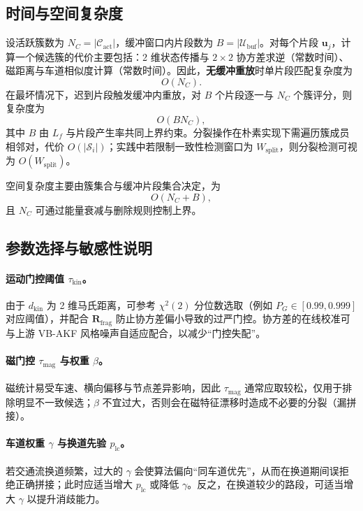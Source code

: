 \documentclass{xdupgthesis}
\begin{document}
\subsection{时间与空间复杂度}
设活跃簇数为 $N_C=|\mathcal{C}_{\mathrm{act}}|$，缓冲窗口内片段数为 $B=|\mathcal{U}_{\mathrm{buf}}|$。对每个片段 $\mathbf{u}_j$，计算一个候选簇的代价主要包括：2 维状态传播与 $2\times2$ 协方差求逆（常数时间）、磁距离与车道相似度计算（常数时间）。因此，\textbf{无缓冲重放}时单片段匹配复杂度为
\[
O(N_C).
\]
在最坏情况下，迟到片段触发缓冲内重放，对 $B$ 个片段逐一与 $N_C$ 个簇评分，则复杂度为
\[
O(BN_C),
\]
其中 $B$ 由 $L_f$ 与片段产生率共同上界约束。分裂操作在朴素实现下需遍历簇成员相邻对，代价 $O(|\mathcal{S}_i|)$；实践中若限制一致性检测窗口为 $W_{\mathrm{split}}$，则分裂检测可视为 $O(W_{\mathrm{split}})$。

空间复杂度主要由簇集合与缓冲片段集合决定，为
\[
O(N_C + B),
\]
且 $N_C$ 可通过能量衰减与删除规则控制上界。%

\subsection{参数选择与敏感性说明}
\paragraph{运动门控阈值 $\tau_{\mathrm{kin}}$。}
由于 $d_{\mathrm{kin}}$ 为 2 维马氏距离，可参考 $\chi^2(2)$ 分位数选取（例如 $P_G\in[0.99,0.999]$ 对应阈值），并配合 $\mathbf{R}_{\mathrm{frag}}$ 防止协方差偏小导致的过严门控。协方差的在线校准可与上游 VB-AKF 风格噪声自适应配合，以减少“门控失配”。%

\paragraph{磁门控 $\tau_{\mathrm{mag}}$ 与权重 $\beta$。}
磁统计易受车速、横向偏移与节点差异影响，因此 $\tau_{\mathrm{mag}}$ 通常应取较松，仅用于排除明显不一致候选；$\beta$ 不宜过大，否则会在磁特征漂移时造成不必要的分裂（漏拼接）。

\paragraph{车道权重 $\gamma$ 与换道先验 $p_{\mathrm{lc}}$。}
若交通流换道频繁，过大的 $\gamma$ 会使算法偏向“同车道优先”，从而在换道期间误拒绝正确拼接；此时应适当增大 $p_{\mathrm{lc}}$ 或降低 $\gamma$。反之，在换道较少的路段，可适当增大 $\gamma$ 以提升消歧能力。
\end{document}
